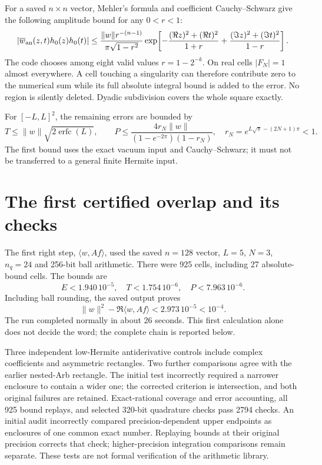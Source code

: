 \documentclass[11pt,a4paper]{article}
\begin{document}
For a saved $n\times n$ vector, Mehler's formula and coefficient
Cauchy--Schwarz give the following amplitude bound for any $0<r<1$:
\[
 |\overline{w}_{\rm an}(z,t)h_0(z)h_0(t)|
 \le \frac{\|w\|r^{-(n-1)}}{\pi\sqrt{1-r^2}}
 \exp\!\left[-\frac{(\Re z)^2+(\Re t)^2}{1+r}
             +\frac{(\Im z)^2+(\Im t)^2}{1-r}\right].
\]
The code chooses among eight valid values $r=1-2^{-k}$.
On real cells $|F_N|=1$ almost everywhere. A cell touching a singularity
can therefore contribute zero to the numerical sum while its full
absolute integral bound is added to the error. No region is silently
deleted. Dyadic subdivision covers the whole square exactly.

For $[-L,L]^2$, the remaining errors are bounded by
\[
 T\le\|w\|\sqrt{2\operatorname{erfc}(L)},\qquad
 P\le\frac{4r_N\|w\|}{(1-e^{-2\pi})(1-r_N)},\quad
 r_N=e^{L\sqrt\pi-(2N+1)\pi}<1.
\]
The first bound uses the exact vacuum input and Cauchy--Schwarz;
it must not be transferred to a general finite Hermite input.

\newpage
\section{The first certified overlap and its checks}
The first right step, $\langle w,Af\rangle$, used the saved $n=128$
vector, $L=5$, $N=3$, $n_q=24$ and 256-bit ball arithmetic.
There were 925 cells, including 27 absolute-bound cells. The bounds are
\[
 E<1.940\,10^{-5},\quad T<1.754\,10^{-6},\quad
 P<7.963\,10^{-6}.
\]
Including ball rounding, the saved output proves
\[
 \boxed{\ \|w\|^2-\Re\langle w,Af\rangle<2.973\,10^{-5}<10^{-4}.\ }
\]
The run completed normally in about 26 seconds. This first calculation
alone does not decide the word; the complete chain is reported below.

Three independent low-Hermite antiderivative controls include complex
coefficients and asymmetric rectangles. Two further comparisons agree
with the earlier nested-Arb rectangle. The initial test incorrectly
required a narrower enclosure to contain a wider one; the corrected
criterion is intersection, and both original failures are retained.
Exact-rational coverage and error accounting, all 925 bound replays,
and selected 320-bit quadrature checks pass 2794 checks. An initial
audit incorrectly compared precision-dependent upper endpoints as
enclosures of one common exact number. Replaying bounds at their
original precision corrects that check; higher-precision integration
comparisons remain separate. These tests are not formal verification
of the arithmetic library.
\end{document}
